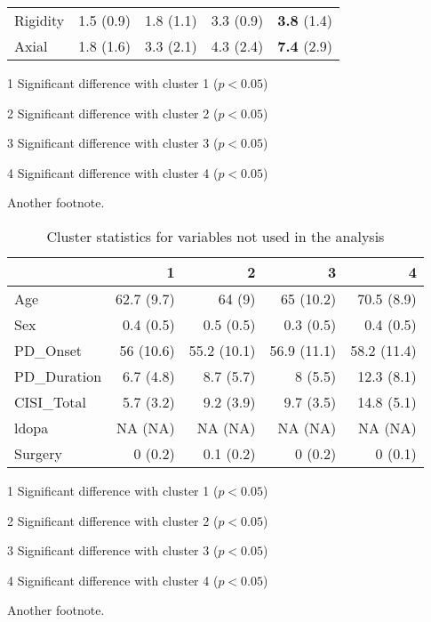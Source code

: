 \documentclass[preprint,3p]{elsarticle} %
\begin{document}
\begin{table}[t]
\begin{threeparttable}
\begin{tabular}{l r r r r}
    Rigidity & 1.5 (0.9)\tnote{234} & 1.8 (1.1)\tnote{134} & 3.3 (0.9)\tnote{124} &
    \textbf{3.8} (1.4)\tnote{123} \\
    Axial & 1.8 (1.6)\tnote{234} & 3.3 (2.1)\tnote{134} & 4.3 (2.4)\tnote{124} &
    \textbf{7.4} (2.9)\tnote{123} \\
    \bottomrule
  \end{tabular}
  \begin{tablenotes}
    \small
    \item[1] Significant difference with cluster 1 ($p < 0.05$)
    \item[2] Significant difference with cluster 2 ($p < 0.05$)
    \item[3] Significant difference with cluster 3 ($p < 0.05$)
    \item[4] Significant difference with cluster 4 ($p < 0.05$)
    \item[\textdagger] Another footnote.
  \end{tablenotes}
  \end{threeparttable}
\end{table}

\begin{table}[t]
  \centering
  \caption{Cluster statistics for variables not used in the analysis}
  \label{tab:nmd_extra}
  \begin{threeparttable}
  \begin{tabular}{l r r r r}
    \toprule
    & 1 & 2 & 3 & 4 \\
    \midrule
      Age & 62.7 (9.7) & 64 (9) & 65 (10.2) & 70.5 (8.9) \\ 
      Sex & 0.4 (0.5) & 0.5 (0.5) & 0.3 (0.5) & 0.4 (0.5) \\ 
      PD\_Onset & 56 (10.6) & 55.2 (10.1) & 56.9 (11.1) & 58.2 (11.4) \\ 
      PD\_Duration & 6.7 (4.8) & 8.7 (5.7) & 8 (5.5) & 12.3 (8.1) \\ 
      CISI\_Total & 5.7 (3.2) & 9.2 (3.9) & 9.7 (3.5) & 14.8 (5.1) \\ 
      ldopa & NA (NA) & NA (NA) & NA (NA) & NA (NA) \\ 
      Surgery & 0 (0.2) & 0.1 (0.2) & 0 (0.2) & 0 (0.1) \\ 
    \bottomrule
  \end{tabular}
  \begin{tablenotes}
    \small
    \item[1] Significant difference with cluster 1 ($p < 0.05$)
    \item[2] Significant difference with cluster 2 ($p < 0.05$)
    \item[3] Significant difference with cluster 3 ($p < 0.05$)
    \item[4] Significant difference with cluster 4 ($p < 0.05$)
    \item[\textdagger] Another footnote.
  \end{tablenotes}
  \end{threeparttable}
\end{table}
\end{document}
